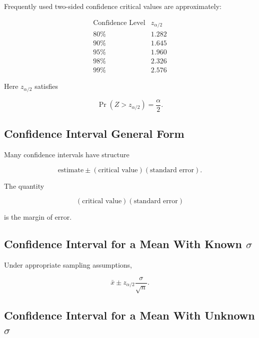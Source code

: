 Frequently used two-sided confidence critical values are approximately:

\[
\boxed{
\begin{array}{c|c}
\text{Confidence Level}
&
z_{\alpha/2}
\\ \hline
80\% & 1.282\\
90\% & 1.645\\
95\% & 1.960\\
98\% & 2.326\\
99\% & 2.576
\end{array}
}
\]

Here \(z_{\alpha/2}\) satisfies

\[
\boxed{
\Pr(Z>z_{\alpha/2})
=
\frac{\alpha}{2}.
}
\]

\subsection{Confidence Interval General Form}
\label{subsec:confidence-interval-general-form}

Many confidence intervals have structure

\[
\boxed{
\text{estimate}
\pm
(\text{critical value})
(\text{standard error}).
}
\]

The quantity

\[
\boxed{
(\text{critical value})
(\text{standard error})
}
\]

is the margin of error.

\subsection{Confidence Interval for a Mean With Known \(\sigma\)}
\label{subsec:ci-mean-known-sigma}

Under appropriate sampling assumptions,

\[
\boxed{
\bar{x}
\pm
z_{\alpha/2}
\frac{
\sigma
}{
\sqrt n
}.
}
\]

\subsection{Confidence Interval for a Mean With Unknown \(\sigma\)}
\label{subsec:ci-mean-unknown-sigma}

